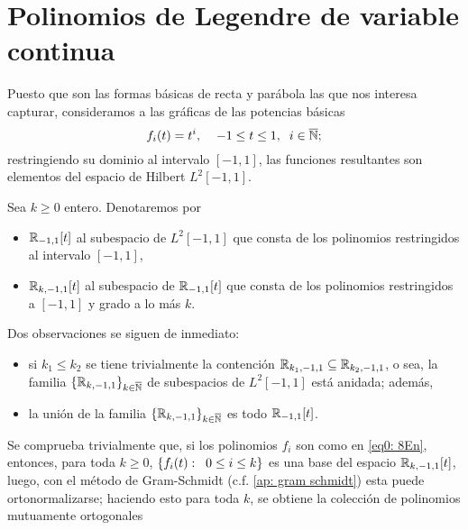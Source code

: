 \section{Polinomios de Legendre de variable continua}
Puesto que son las
formas básicas de recta y parábola las que nos interesa
capturar,
consideramos a las gráficas de las potencias básicas
\begin{equation}
\label{eq0: 8En}
f_{i}(t)= t^{i}, \hspace{0.4cm}
-1 \leq t \leq 1, \hspace{0.2cm}
i \in \overline{\mathbb{N}};
\end{equation}
restringiendo su dominio al intervalo $[-1,1]$,
las funciones resultantes son 
elementos del 
espacio de Hilbert $L^{2}[-1,1]$. 


\begin{notacion}
\label{notacion: 17ap}
Sea $k \geq 0$ entero.
Denotaremos por 
\begin{itemize}
	\item $\mathbb{R}_{-1,1}[t]$ al subespacio de $L^{2}[-1,1]$ que consta de los
	polinomios restringidos al intervalo $[-1,1]$,
	
	\item $\mathbb{R}_{k,-1,1}[t]$ al subespacio de $\mathbb{R}_{-1,1}[t]$
	que consta de los polinomios restringidos a $[-1,1]$ y grado a lo
	más $k$.
\end{itemize}
\end{notacion}


Dos observaciones se siguen de inmediato:
\begin{itemize}
	\item si $k_{1} \leq k_{2}$ se tiene trivialmente la contención
$\mathbb{R}_{k_{1}, -1,1} \subseteq \mathbb{R}_{k_{2}, -1,1}$, o sea, la familia
$\{\mathbb{R}_{k, -1,1}\}_{k \in \overline{\mathbb{N}}}$ de subespacios
de $L^{2}[-1,1]$ está anidada; además, 

	\item la unión de la familia $\{\mathbb{R}_{k, -1,1}\}_{k \in \overline{\mathbb{N}}}$
	es todo $\mathbb{R}_{-1,1}[t]$.
\end{itemize}


Se comprueba trivialmente que, si los polinomios
$f_{i}$ son como en \eqref{eq0: 8En}, entonces,
para toda $k \geq 0$, $\{f_{i}(t): \hspace{0.2cm} 0 \leq i \leq k \}$
es una base del espacio $\mathbb{R}_{k,-1,1}[t]$, luego, con el 
método de Gram-Schmidt
(c.f. \ref{ap: gram schmidt}) esta puede ortonormalizarse; haciendo esto
para toda $k$, se obtiene la colección
de polinomios mutuamente ortogonales


